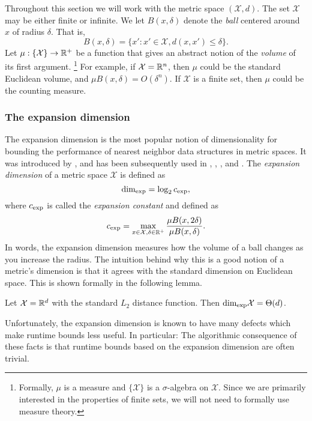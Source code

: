 \documentclass[../main.tex]{subfiles}
\newcommand{\set}[1]{\mathcal {#1}}
\newcommand{\dist}[2]{\distf({#1},{#2})}
\newcommand{\distf}{d}
\newcommand{\krdim}{\text{dim}_\textnormal{exp}}
\newcommand{\krnum}{c_\textnormal{exp}}
\begin{document}
Throughout this section we will work with the metric space $(\set X,d)$.
The set $\set X$ may be either finite or infinite.
We let $B(x,\delta)$ denote the \emph{ball} centered around $x$ of radius $\delta$. 
That is,
\begin{equation}
    B(x,\delta) = \{ x' : x'\in\set X, \dist{x}{x'} \le \delta \}.
\end{equation}
Let $\mu : \{\set X\} \to \R^+$ be a function that gives an abstract notion of the \emph{volume} of its first argument.%
\footnote{
    Formally, $\mu$ is a measure and $\{\set X\}$ is a $\sigma$-algebra on $\set X$.
    Since we are primarily interested in the properties of finite sets,
    we will not need to formally use measure theory.
}
For example, if $\set X=\R^n$, then $\mu$ could be the standard Euclidean volume,
and $\mu B(x,\delta) = O(\delta^n)$.
If $\set X$ is a finite set, then $\mu$ could be the counting measure.


\subsubsection{The expansion dimension}

The expansion dimension is the most popular notion of dimensionality for bounding the performance of nearest neighbor data structures in metric spaces.
It was introduced by
\citet{karger2002finding},
and has been subsequently used in
\citet{krauthgamer2004navigating},
\citet{beygelzimer2006cover},
\citet{ram2009linear},
and \citet{curtin2015plug}.
The \emph{expansion dimension} of a metric space $\set X$ is defined as
\begin{equation}
    \krdim = \log_2 \krnum
    ,
\end{equation}
where $\krnum$ is called the \emph{expansion constant} and defined as
\begin{equation}
    \krnum = \max_{x\in\set X, \delta\in\R^+} \frac{\mu B(x,2\delta)}{\mu B(x,\delta)}
    .
\end{equation}
In words, the expansion dimension measures how the volume of a ball changes as you increase the radius.
The intuition behind why this is a good notion of a metric's dimension is that it agrees with the standard dimension on Euclidean space.
This is shown formally in the following lemma.
\begin{lemma}
    Let $\set X=\R^d$ with the standard $L_2$ distance function.
    Then $\krdim\set X=\Theta(d)$.
\end{lemma}
Unfortunately, the expansion dimension is known to have many defects which make runtime bounds less useful.
In particular:
The algorithmic consequence of these facts is that runtime bounds based on the expansion dimension are often trivial.
\end{document}
